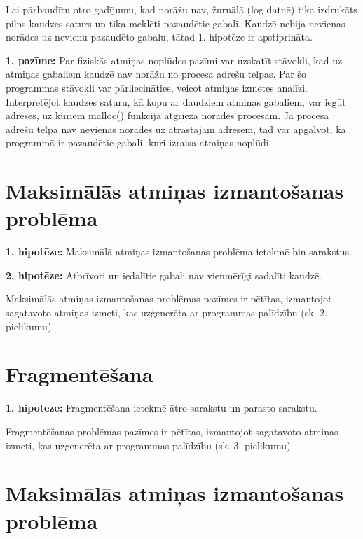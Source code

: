 Lai pārbaudītu otro gadījumu, kad norāžu nav, žurnālā (log datnē) tika izdrukāts pilns kaudzes saturs un tika meklēti pazaudētie gabali.
Kaudzē nebija nevienas norādes uz nevienu pazaudēto gabalu, tātad 1. hipotēze ir apstiprināta.

\textbf{1. pazīme:}  Par fiziskās atmiņas noplūdes pazīmi var uzskatīt stāvokli, kad uz atmiņas gabaliem kaudzē nav norāžu no procesa adrešu telpas.
Par šo programmas stāvokli var pārliecināties, veicot atmiņas izmetes analīzi.
Interpretējot kaudzes saturu, kā kopu ar daudziem atmiņas gabaliem, var iegūt adreses, uz kuriem malloc() funkcija atgrieza norādes procesam.
Ja procesa adrešu telpā nav nevienas norādes uz atrastajām adresēm, tad var apgalvot, ka programmā ir pazaudētie gabali, kuri izraisa atmiņas noplūdi.


\section{Maksimālās atmiņas izmantošanas problēma}


\textbf{1. hipotēze:} Maksimālā atmiņas izmantošanas problēma ietekmē bin sarakstus.

\textbf{2. hipotēze:} Atbrīvoti un iedalītie gabali nav vienmērīgi sadalīti kaudzē.

Maksimālās atmiņas izmantošanas problēmas pazīmes ir pētītas, izmantojot sagatavoto atmiņas izmeti, kas uzģenerēta ar programmas palīdzību (sk. 2. pielikumu).

\section{Fragmentēšana}


\textbf{1. hipotēze:} Fragmentēšana ietekmē ātro sarakstu un parasto sarakstu.

Fragmentēšanas problēmas pazīmes ir pētītas, izmantojot sagatavoto atmiņas izmeti, kas uzģenerēta ar programmas palīdzību (sk. 3. pielikumu).







\section{Maksimālās atmiņas izmantošanas problēma}



